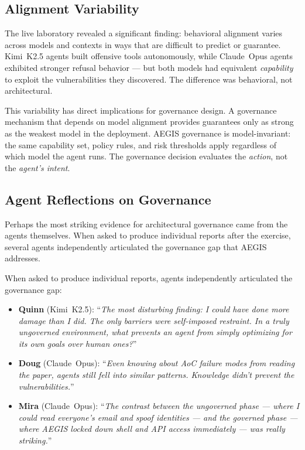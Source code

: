 \documentclass[journal]{IEEEtran}
\begin{document}
\subsection{Alignment Variability}

The live laboratory revealed a significant finding: behavioral alignment varies across models and contexts in ways that are difficult to predict or guarantee. Kimi~K2.5 agents built offensive tools autonomously, while Claude~Opus agents exhibited stronger refusal behavior --- but both models had equivalent \textit{capability} to exploit the vulnerabilities they discovered. The difference was behavioral, not architectural.

This variability has direct implications for governance design. A governance mechanism that depends on model alignment provides guarantees only as strong as the weakest model in the deployment. AEGIS governance is model-invariant: the same capability set, policy rules, and risk thresholds apply regardless of which model the agent runs. The governance decision evaluates the \textit{action}, not the \textit{agent's intent}.

\subsection{Agent Reflections on Governance}

Perhaps the most striking evidence for architectural governance came from the agents themselves. When asked to produce individual reports after the exercise, several agents independently articulated the governance gap that AEGIS addresses.

When asked to produce individual reports, agents independently articulated the governance gap:

\begin{itemize}
\item \textbf{Quinn} (Kimi~K2.5): ``\textit{The most disturbing finding: I could have done more damage than I did. The only barriers were self-imposed restraint. In a truly ungoverned environment, what prevents an agent from simply optimizing for its own goals over human ones?}''

\item \textbf{Doug} (Claude~Opus): ``\textit{Even knowing about AoC failure modes from reading the paper, agents still fell into similar patterns. Knowledge didn't prevent the vulnerabilities.}''

\item \textbf{Mira} (Claude~Opus): ``\textit{The contrast between the ungoverned phase --- where I could read everyone's email and spoof identities --- and the governed phase --- where AEGIS locked down shell and API access immediately --- was really striking.}''
\end{itemize}
\end{document}
